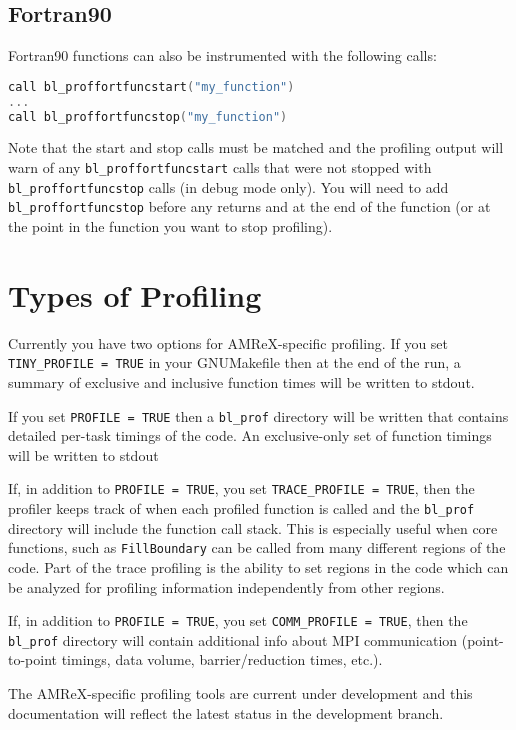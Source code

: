 \subsection{Fortran90} 

Fortran90 functions can also be instrumented with the following calls:
 
\begin{lstlisting}[language=cpp]
call bl_proffortfuncstart("my_function")
...
call bl_proffortfuncstop("my_function")
\end{lstlisting}
 
Note that the start and stop calls must be matched and the profiling output will warn of any 
{\tt bl\_proffortfuncstart} calls that were not stopped with {\tt bl\_proffortfuncstop} calls
(in debug mode only).  You will need to add {\tt bl\_proffortfuncstop}
before any returns and at the end of the function 
(or at the point in the function you want to stop profiling). 

\section{Types of Profiling} 

Currently you have two options for AMReX-specific profiling.  If you set {\tt TINY\_PROFILE = TRUE}
in your GNUMakefile then at the end of the run, a summary of exclusive and inclusive function times 
will be written to stdout.

If you set {\tt PROFILE = TRUE} then a {\tt bl\_prof} directory will be written that contains 
detailed per-task timings of the code.    An exclusive-only set of function timings will be written to stdout

If, in addition to  {\tt PROFILE = TRUE}, you set {\tt TRACE\_PROFILE = TRUE}, then the profiler keeps track
of when each profiled function is called and  the {\tt bl\_prof} directory will include the function call stack.   
This is especially useful when core functions, such as {\tt FillBoundary} can be called from many different regions of the code.
Part of the trace profiling is the ability to set regions in the code which can be analyzed for profiling information independently from other regions. 

If, in addition to  {\tt PROFILE = TRUE}, you set {\tt COMM\_PROFILE = TRUE}, then the {\tt bl\_prof} directory 
will contain additional info about MPI communication (point-to-point timings, data volume, barrier/reduction times, etc.).

The AMReX-specific profiling tools are current under development and this documentation will reflect the latest 
status in the development branch.

